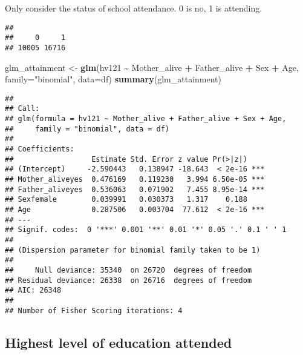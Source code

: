 \documentclass[
]{article}
\newenvironment{Shaded}{\begin{snugshade}}{\end{snugshade}}
\newcommand{\AttributeTok}[1]{\textcolor[rgb]{0.13,0.29,0.53}{#1}}
\newcommand{\FunctionTok}[1]{\textcolor[rgb]{0.13,0.29,0.53}{\textbf{#1}}}
\newcommand{\NormalTok}[1]{#1}
\newcommand{\OtherTok}[1]{\textcolor[rgb]{0.56,0.35,0.01}{#1}}
\newcommand{\SpecialCharTok}[1]{\textcolor[rgb]{0.81,0.36,0.00}{\textbf{#1}}}
\newcommand{\StringTok}[1]{\textcolor[rgb]{0.31,0.60,0.02}{#1}}
\begin{document}
Only consider the status of school attendance. 0 is no, 1 is attending.

\begin{Shaded}
\end{Shaded}

\begin{verbatim}
## 
##     0     1 
## 10005 16716
\end{verbatim}

\begin{Shaded}
\begin{Highlighting}[]
\NormalTok{glm\_attainment }\OtherTok{\textless{}{-}} \FunctionTok{glm}\NormalTok{(hv121 }\SpecialCharTok{\textasciitilde{}}\NormalTok{ Mother\_alive }\SpecialCharTok{+}\NormalTok{ Father\_alive }\SpecialCharTok{+}\NormalTok{ Sex }\SpecialCharTok{+}\NormalTok{ Age,}
                      \AttributeTok{family=}\StringTok{"binomial"}\NormalTok{, }\AttributeTok{data=}\NormalTok{df)}
\FunctionTok{summary}\NormalTok{(glm\_attainment)}
\end{Highlighting}
\end{Shaded}

\begin{verbatim}
## 
## Call:
## glm(formula = hv121 ~ Mother_alive + Father_alive + Sex + Age, 
##     family = "binomial", data = df)
## 
## Coefficients:
##                  Estimate Std. Error z value Pr(>|z|)    
## (Intercept)     -2.590443   0.138947 -18.643  < 2e-16 ***
## Mother_aliveyes  0.476169   0.119230   3.994 6.50e-05 ***
## Father_aliveyes  0.536063   0.071902   7.455 8.95e-14 ***
## Sexfemale        0.039991   0.030373   1.317    0.188    
## Age              0.287506   0.003704  77.612  < 2e-16 ***
## ---
## Signif. codes:  0 '***' 0.001 '**' 0.01 '*' 0.05 '.' 0.1 ' ' 1
## 
## (Dispersion parameter for binomial family taken to be 1)
## 
##     Null deviance: 35340  on 26720  degrees of freedom
## Residual deviance: 26338  on 26716  degrees of freedom
## AIC: 26348
## 
## Number of Fisher Scoring iterations: 4
\end{verbatim}

\hypertarget{highest-level-of-education-attended}{%
\subsection{Highest level of education
attended}\label{highest-level-of-education-attended}}
\end{document}
